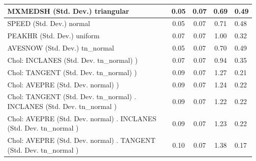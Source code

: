 \begin{table}
\begin{center}
\begin{tabular}{|l|l|c|c|c|l|}
			\hline
			MXMEDSH (Std. Dev.) triangular &  & 0.05 & 0.07 & 0.69 & 0.49 \\
			\hline
			SPEED (Std. Dev.) normal &  & 0.05 & 0.07 & 0.71 & 0.48 \\
			\hline
			PEAKHR (Std. Dev.) uniform &  & 0.07 & 0.07 & 1.00 & 0.32 \\
			\hline
			AVESNOW (Std. Dev.) tn_normal &  & 0.05 & 0.07 & 0.70 & 0.49 \\
			\hline
			 Chol: INCLANES (Std. Dev. tn_normal) ) &  & 0.07 & 0.07 & 0.94 & 0.35 \\
			\hline
			 Chol: TANGENT (Std. Dev. tn_normal) ) &  & 0.09 & 0.07 & 1.27 & 0.21 \\
			\hline
			 Chol: AVEPRE (Std. Dev. normal) ) &  & 0.09 & 0.07 & 1.24 & 0.22 \\
			\hline
			 Chol: TANGENT (Std. Dev. tn_normal) . INCLANES (Std. Dev.   tn_normal ) &  & 0.09 & 0.07 & 1.22 & 0.22 \\
			\hline
			 Chol: AVEPRE (Std. Dev. normal) . INCLANES (Std. Dev.   tn_normal ) &  & 0.09 & 0.07 & 1.23 & 0.22 \\
			\hline
			 Chol: AVEPRE (Std. Dev. normal) . TANGENT (Std. Dev.   tn_normal ) &  & 0.10 & 0.07 & 1.38 & 0.17 \\
			\hline
		\end{tabular}
	\end{center}
\end{table}